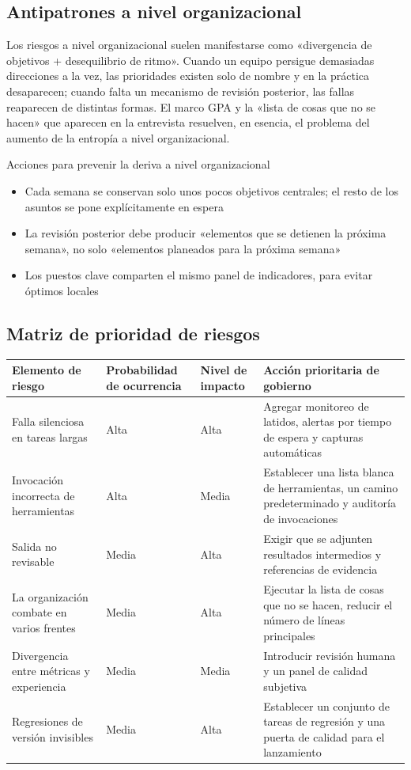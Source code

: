 \documentclass[a4paper]{article}
\begin{document}
\subsection{Antipatrones a nivel organizacional}

Los riesgos a nivel organizacional suelen manifestarse como «divergencia de objetivos + desequilibrio de ritmo». Cuando un equipo persigue demasiadas direcciones a la vez, las prioridades existen solo de nombre y en la práctica desaparecen; cuando falta un mecanismo de revisión posterior, las fallas reaparecen de distintas formas. El marco GPA y la «lista de cosas que no se hacen» que aparecen en la entrevista resuelven, en esencia, el problema del aumento de la entropía a nivel organizacional.

\begin{importantbox}{Acciones para prevenir la deriva a nivel organizacional}
\begin{itemize}
    \item Cada semana se conservan solo unos pocos objetivos centrales; el resto de los asuntos se pone explícitamente en espera
    \item La revisión posterior debe producir «elementos que se detienen la próxima semana», no solo «elementos planeados para la próxima semana»
    \item Los puestos clave comparten el mismo panel de indicadores, para evitar óptimos locales
\end{itemize}
\end{importantbox}

\subsection{Matriz de prioridad de riesgos}

\begin{center}
\begin{tabular}{p{3.2cm}p{2.1cm}p{2.1cm}p{5.4cm}}
\toprule
Elemento de riesgo & Probabilidad de ocurrencia & Nivel de impacto & Acción prioritaria de gobierno \\
\midrule
Falla silenciosa en tareas largas & Alta & Alta & Agregar monitoreo de latidos, alertas por tiempo de espera y capturas automáticas \\
Invocación incorrecta de herramientas & Alta & Media & Establecer una lista blanca de herramientas, un camino predeterminado y auditoría de invocaciones \\
Salida no revisable & Media & Alta & Exigir que se adjunten resultados intermedios y referencias de evidencia \\
La organización combate en varios frentes & Media & Alta & Ejecutar la lista de cosas que no se hacen, reducir el número de líneas principales \\
Divergencia entre métricas y experiencia & Media & Media & Introducir revisión humana y un panel de calidad subjetiva \\
Regresiones de versión invisibles & Media & Alta & Establecer un conjunto de tareas de regresión y una puerta de calidad para el lanzamiento \\
\bottomrule
\end{tabular}
\end{center}
\end{document}
